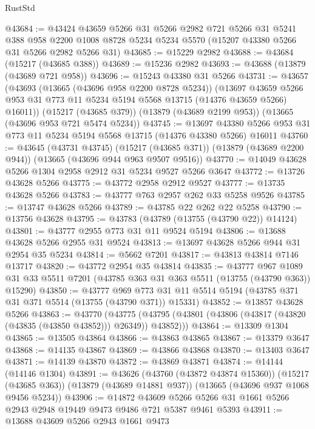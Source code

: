 \begin{lexlean}{RustStd}
\begin{coremodule}
@43684 := @43424
    @43659
    @5266
    @31
    @5266
    @2982
    @721
    @5266
    @31
    @5241
    @388
    @958
    @2200
    @1008
    @8728
    @5234
    @5234
    @5570
    (@15207 @43380 @5266 @31 @5266 @2982 @5266 @31)
@43685 := @15229 @2982
@43688 := @43684 (@15217 (@43685 @388))
@43689 := @15236 @2982
@43693 := @43688 (@13879 (@43689 @721 @958))
@43696 := @15243 @43380 @31 @5266
@43731 := @43657
    (@43693
      (@13665 (@43696 @958 @2200 @8728 @5234))
      (@13697 @43659 @5266 @953 @31 @773 @11 @5234 @5194 @5568 @13715 (@14376 @43659 @5266) @16011))
    (@15217 (@43685 @379))
    (@13879 (@43689 @2199 @953))
    (@13665 (@43696 @953 @721 @5474 @5234))
@43745 := @13697
    @43380
    @5266
    @953
    @31
    @773
    @11
    @5234
    @5194
    @5568
    @13715
    (@14376 @43380 @5266)
    @16011
@43760 := @43645
    (@43731 @43745)
    (@15217 (@43685 @371))
    (@13879 (@43689 @2200 @944))
    (@13665 (@43696 @944 @963 @9507 @9516))
@43770 := @14049 @43628 @5266 @1304 @2958 @2912 @31 @5234 @9527 @5266 @3647
@43772 := @13726 @43628 @5266
@43775 := @43772 @2958 @2912 @9527
@43777 := @13735 @43628 @5266
@43783 := @43777 @763 @2957 @262 @33 @5258 @9526
@43785 := @13747 @43628 @5266
@43789 := @43785 @22 @262 @22 @5258
@43790 := @13756 @43628
@43795 := @43783 (@43789 (@13755 (@43790 @22)) @14124)
@43801 := @43777 @2955 @773 @31 @11 @9524 @5194
@43806 := @13688 @43628 @5266 @2955 @31 @9524
@43813 := @13697 @43628 @5266 @944 @31 @2954 @35 @5234
@43814 := @5662 @7201
@43817 := @43813 @43814 @7146 @13717
@43820 := @43772 @2954 @35 @43814
@43835 := @43777
    @967
    @1089
    @31
    @33
    @5511
    @7201
    (@43785 @363 @31 @363 @5511 (@13755 (@43790 @363)) @15290)
@43850 := @43777
    @969
    @773
    @31
    @11
    @5514
    @5194
    (@43785 @371 @31 @371 @5514 (@13755 (@43790 @371)) @15331)
@43852 := @13857 @43628 @5266
@43863 := @43770
    (@43775 (@43795 (@43801 (@43806 (@43817 (@43820 (@43835 (@43850 @43852))) @26349)) @43852)))
@43864 := @13309 @1304
@43865 := @13505 @43864
@43866 := @43863 @43865
@43867 := @13379 @3647
@43868 := @14135 @43867
@43869 := @43866 @43868
@43870 := @13403 @3647
@43871 := @14139 @43870
@43872 := @43869 @43871
@43874 := @14144 (@14146 @1304)
@43891 := @43626
    (@43760 (@43872 @43874 @15360))
    (@15217 (@43685 @363))
    (@13879 (@43689 @14881 @937))
    (@13665 (@43696 @937 @1068 @9456 @5234))
@43906 := @14872
    @43609
    @5266
    @5266
    @31
    @1661
    @5266
    @2943
    @2948
    @19449
    @9473
    @9486
    @721
    @5387
    @9461
    @5393
@43911 := @13688 @43609 @5266 @2943 @1661 @9473

\end{coremodule}
\end{lexlean}
